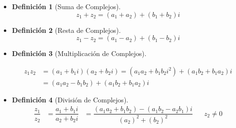 \documentclass[12pt, fleqn]{report}                             %
\newcommand \ForceNewLine {$\Space$\\}                          %
\DeclareMathOperator \Space {\quad}                             %
\newtheorem{Definition}{Definición}[section]                    %
\newenvironment{MultiLineEquation}[1]                           %
        {\begin{equation}\begin{alignedat}{#1}}                     %
        {\end{alignedat}\end{equation}}                             %
\begin{document}
            \begin{itemize}

                \item
                    \begin{Definition}[Suma de Complejos]
                    \label{SumaComplejos}
                        \begin{equation}
                            z_1 + z_2 = (a_1+a_2) + (b_1+b_2)i
                        \end{equation}
                    \end{Definition}

                \item
                    \begin{Definition}[Resta de Complejos]
                    \label{RestaComplejos}
                        \begin{equation}
                            z_1 - z_2 = (a_1-a_2) + (b_1-b_2)i
                        \end{equation}
                    \end{Definition}

                \item 
                    \begin{Definition}[Multiplicación de Complejos]
                    \label{MultiplicacionComplejos}

                        \begin{MultiLineEquation}{1}
                            z_1 z_2 &= (a_1+b_1i)(a_2+b_2i) 
                                     = (a_1a_2 + b_1b_2i^2) + (a_1b_2 + b_1a_2)i  \\
                                    &= (a_1a_2 - b_1b_2)   + (a_1b_2 + b_1a_2)i
                        \end{MultiLineEquation}

                    \end{Definition}

                \item 
                    \begin{Definition}[División de Complejos]
                    \label{DivisionComplejos}
                    \ForceNewLine
                        \begin{MultiLineEquation}{1}
                            \dfrac{z_1}{z_2}    &= \dfrac{a_1+b_1i}{a_2+b_2i} 
                                                &= \dfrac{(a_1a_2+b_1b_2)-(a_1b_2-a_2b_1)i}{(a_2)^2+(b_2)^2} \Space z_2 \neq 0
                        \end{MultiLineEquation}

                    \end{Definition}

            \end{itemize}
\end{document}
